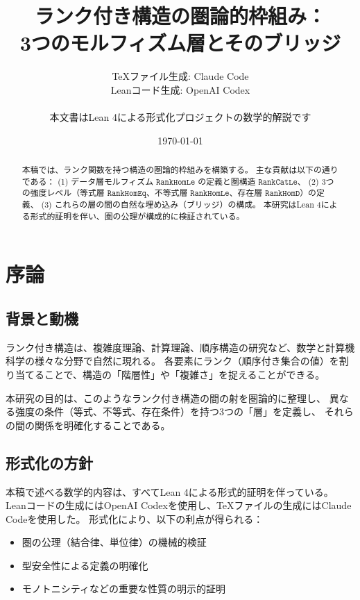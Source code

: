 \documentclass[11pt,a4paper,ja=standard]{bxjsarticle}
\title{ランク付き構造の圏論的枠組み：\\
3つのモルフィズム層とそのブリッジ}
\author{%
  TeXファイル生成: Claude Code\\
  Leanコード生成: OpenAI Codex\\
  \medskip\\
  \small 本文書はLean 4による形式化プロジェクトの数学的解説です
}
\date{\today}
\theoremstyle{definition}
\newcommand{\RankHomLe}{\mathtt{RankHomLe}}
\newcommand{\RankHomEq}{\mathtt{RankHomEq}}
\newcommand{\RankHomD}{\mathtt{RankHomD}}
\newcommand{\RankCatLe}{\mathtt{RankCatLe}}
\begin{document}
\maketitle

\begin{abstract}
本稿では、ランク関数を持つ構造の圏論的枠組みを構築する。
主な貢献は以下の通りである：
(1) データ層モルフィズム $\RankHomLe$ の定義と圏構造 $\RankCatLe$、
(2) 3つの強度レベル（等式層 $\RankHomEq$、不等式層 $\RankHomLe$、存在層 $\RankHomD$）の定義、
(3) これらの層の間の自然な埋め込み（ブリッジ）の構成。
本研究はLean 4による形式的証明を伴い、圏の公理が構成的に検証されている。
\end{abstract}

\tableofcontents
\clearpage

\section{序論}

\subsection{背景と動機}

ランク付き構造は、複雑度理論、計算理論、順序構造の研究など、数学と計算機科学の様々な分野で自然に現れる。
各要素にランク（順序付き集合の値）を割り当てることで、構造の「階層性」や「複雑さ」を捉えることができる。

本研究の目的は、このようなランク付き構造の間の射を圏論的に整理し、
異なる強度の条件（等式、不等式、存在条件）を持つ3つの「層」を定義し、
それらの間の関係を明確化することである。

\subsection{形式化の方針}

本稿で述べる数学的内容は、すべてLean 4による形式的証明を伴っている。
Leanコードの生成にはOpenAI Codexを使用し、TeXファイルの生成にはClaude Codeを使用した。
形式化により、以下の利点が得られる：

\begin{itemize}
\item 圏の公理（結合律、単位律）の機械的検証
\item 型安全性による定義の明確化
\item モノトニシティなどの重要な性質の明示的証明
\end{itemize}
\end{document}
